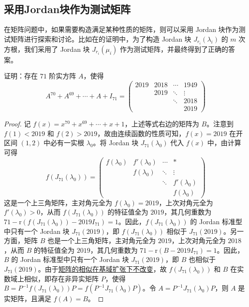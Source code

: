 \documentclass[../../main.tex]{subfiles}%
\begin{document}
\subsection{采用Jordan块作为测试矩阵}

在矩阵问题中，如果需要构造满足某种性质的矩阵，则可以采用 Jordan 块作为测试矩阵进行探索和讨论。比如在的证明中，为了构造 Jordan 块 $J_{r_i}(\lambda_i)$ 的 $m$ 次方根，我们采用了 Jordan 块 $J_{r_i}(\mu_i)$ 作为测试矩阵，并最终得到了正确的答案。

\begin{example}
证明：存在 $71$ 阶实方阵 $A$，使得
\[
A^{70}+A^{69}+\cdots+A + I_{71}=
\begin{pmatrix}
2019 & 2018 & \cdots & 1949 \\
& 2019 & \ddots & \vdots \\
& & \ddots & 2018 \\
& & & 2019
\end{pmatrix}
\]
\end{example}
\begin{proof}

记 $f(x) = x^{70}+x^{69}+\cdots+x + 1$，上述等式右边的矩阵为 $B$。注意到 $f(1) < 2019$ 和 $f(2) > 2019$，故由连续函数的性质可知，$f(x)=2019$ 在开区间 $(1,2)$ 中必有一实根 $\lambda_0$。将 Jordan 块 $J_{71}(\lambda_0)$ 代入 $f(x)$ 中，由计算可得
\[
f(J_{71}(\lambda_0))=
\begin{pmatrix}
f(\lambda_0) & f'(\lambda_0) & \cdots & * \\
& f(\lambda_0) & \ddots & \vdots \\
& & \ddots & f'(\lambda_0) \\
& & & f(\lambda_0)
\end{pmatrix}
\]
这是一个上三角矩阵，主对角元全为 $f(\lambda_0)=2019$，上次对角元全为 $f'(\lambda_0)>0$，从而 $f(J_{71}(\lambda_0))$ 的特征值全为 $2019$，其几何重数为 $71 - \mathrm{r}(f(J_{71}(\lambda_0)) - 2019I_{71}) = 1$。因此，$f(J_{71}(\lambda_0))$ 的 Jordan 标准型中只有一个 Jordan 块 $J_{71}(2019)$，即 $f(J_{71}(\lambda_0))$ 相似于 $J_{71}(2019)$。另一方面，矩阵 $B$ 也是一个上三角矩阵，主对角元全为 $2019$，上次对角元全为 $2018$，从而 $B$ 的特征值全为 $2019$，其几何重数为 $71 - \mathrm{r}(B - 2019I_{71}) = 1$。因此，$B$ 的 Jordan 标准型中只有一个 Jordan 块 $J_{71}(2019)$，即 $B$ 也相似于 $J_{71}(2019)$。由于\hyperref[corollary:矩阵的相似关系在基域扩张下不变]{矩阵的相似在基域扩张下不改变}，故 $f(J_{71}(\lambda_0))$ 和 $B$ 在实数域上相似，即存在非异实矩阵 $P$，使得 $B = P^{-1}f(J_{71}(\lambda_0))P = f(P^{-1}J_{71}(\lambda_0)P)$。令 $A = P^{-1}J_{71}(\lambda_0)P$，则 $A$ 是实矩阵，且满足 $f(A) = B$。

\end{proof}
\end{document}
